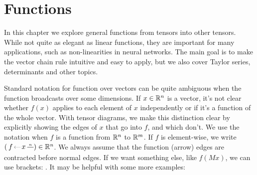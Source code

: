 

\chapter{Functions}\label{chapter:functions}


In this chapter we explore general functions from tensors into other tensors.
While not quite as elegant as linear functions, they are important for many applications, such as non-linearities in neural networks.
The main goal is to make the vector chain rule intuitive and easy to apply, but we also cover Taylor series, determinants and other topics.

Standard notation for function over vectors can be quite ambiguous when the function broadcasts over some dimensions.
If $x\in\mathbb R^n$ is a vector, it's not clear whether $f(x)$ applies to each element of $x$ independently or if it's a function of the whole vector.
With tensor diagrams, we make this distinction clear by explicitly showing the edges of $x$ that go into $f$, and which don't.
We use the notation 
when $f$ is a function from $\mathbb R^n$ to $\mathbb R^m$.
If $f$ is element-wise, we write
$(\tikz[baseline=-.25em, inner sep=2pt]{
   \draw[->, densely dotted] (.3,0) node[right](x){$x$} -- (0,0) node(f)[left]{$f$};
   \draw (x) -- ++(.5,0) node[midway, above, font=\tiny] {$n$};
}) \in \R^n$.
We always assume that the function (arrow) edges are contracted before normal edges.
If we want something else, like $f(Mx)$, we can use brackets:
.
It may be helpful with some more examples:
\vspace{-1.5em}
